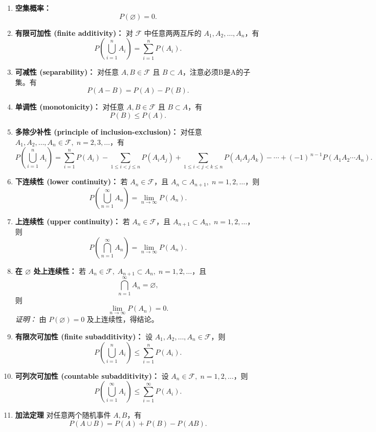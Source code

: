 \begin{proposition}[概率空间性质]
 \begin{enumerate}
  \item \textbf{空集概率：}
  \[
    P(\varnothing) = 0.
  \]

  \item \textbf{有限可加性 (finite additivity)：}  
  对 $\mathscr{F}$ 中任意两两互斥的 $A_1, A_2, \dots, A_n$，有
  \[
    P\!\left(\bigcup_{i=1}^n A_i\right) 
    = \sum_{i=1}^n P(A_i). \tag{1.3.2}
  \]

  \item \textbf{可减性 (separability)：}  
  对任意 $A,B \in \mathscr{F}$ 且 $B \subset A$，注意必须B是A的子集。有
  \[
    P(A-B) = P(A) - P(B).
  \]

  \item \textbf{单调性 (monotonicity)：}  
  对任意 $A,B \in \mathscr{F}$ 且 $B \subset A$，有
  \[
    P(B) \leq P(A).
  \]

  \item \textbf{多除少补性 (principle of inclusion-exclusion)：}  
  对任意 $A_1, A_2, \dots, A_n \in \mathscr{F},\; n=2,3,\dots$，有
  \[
    P\!\left(\bigcup_{i=1}^n A_i\right)
    = \sum_{i=1}^n P(A_i)
    - \sum_{1 \leq i < j \leq n} P(A_i A_j)
    + \sum_{1 \leq i < j < k \leq n} P(A_i A_j A_k)
    - \cdots
    + (-1)^{\,n-1} P(A_1 A_2 \cdots A_n). \tag{1.3.3}
  \]
  \item \textbf{下连续性 (lower continuity)：}  
  若 $A_n \in \mathscr{F}$，且 $A_n \subset A_{n+1},\; n=1,2,\dots$，则
  \[
    P\!\left(\bigcup_{n=1}^\infty A_n\right) = \lim_{n \to \infty} P(A_n).
  \]

  \item \textbf{上连续性 (upper continuity)：}  
  若 $A_n \in \mathscr{F}$，且 $A_{n+1} \subset A_n,\; n=1,2,\dots$，则
  \[
    P\!\left(\bigcap_{n=1}^\infty A_n\right) = \lim_{n \to \infty} P(A_n).
  \]

  \item \textbf{在 $\varnothing$ 处上连续性：}  
  若 $A_n \in \mathscr{F},\; A_{n+1} \subset A_n,\; n=1,2,\dots$，且
  \[
    \bigcap_{n=1}^\infty A_n = \varnothing,
  \]
  则
  \[
    \lim_{n \to \infty} P(A_n) = 0.
  \]
  \textit{证明：} 由 $P(\varnothing)=0$ 及上连续性，得结论。

  \item \textbf{有限次可加性 (finite subadditivity)：}  
  设 $A_1,A_2,\dots,A_n \in \mathscr{F}$，则
  \[
    P\!\left(\bigcup_{i=1}^n A_i\right) \leq \sum_{i=1}^n P(A_i). \tag{1.3.5}
  \]

  \item \textbf{可列次可加性 (countable subadditivity)：}  
  设 $A_n \in \mathscr{F},\; n=1,2,\dots$，则
  \[
    P\!\left(\bigcup_{i=1}^\infty A_i\right) \leq \sum_{i=1}^\infty P(A_i). \tag{1.3.6}
  \]
  
  \item \textbf{加法定理}
对任意两个随机事件 $A, B$，有
\[
P(A \cup B) = P(A) + P(B) - P(AB).
\]

\end{enumerate}   
\end{proposition}
